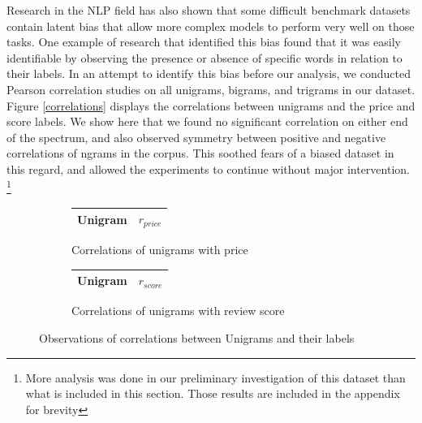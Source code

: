 \documentclass[10pt]{IEEEtran}
\begin{document}
    Research in the NLP field has also shown that some difficult benchmark datasets contain latent bias that allow more complex models to perform very well on those tasks. One example of research that identified this bias found that it was easily identifiable by observing the presence or absence of specific words in relation to their labels\cite{clever_hans}. In an attempt to identify this bias before our analysis, we conducted Pearson correlation studies on all unigrams, bigrams, and trigrams in our dataset. Figure \ref{correlations} displays the correlations between unigrams and the price and score labels. We show here that we found no significant correlation on either end of the spectrum, and also observed symmetry between positive and negative correlations of ngrams in the corpus. This soothed fears of a biased dataset in this regard, and allowed the experiments to continue without major intervention.
    \footnote{More analysis was done in our preliminary investigation of this dataset than what is included in this section. Those results are included in the appendix for brevity} \par

    \begin{figure}
    \centering
    \begin{subfigure}[t]{0.4\columnwidth}
    \begin{tabular}{ |l||r| }
        \hline
        Unigram & $r_{price}$ \\
        \hline
        \hline
    \end{tabular}
    \caption{Correlations of unigrams with price}
    \end{subfigure}
    \begin{subfigure}[t]{0.4\columnwidth}
        \begin{tabular}{ |l||r| }
            \hline
            Unigram & $r_{score}$ \\
            \hline
            \hline
        \end{tabular}
        \caption{Correlations of unigrams with review score}
        \end{subfigure}
    \caption{Observations of correlations between Unigrams and their labels}
    \end{figure}

    
\end{document}

